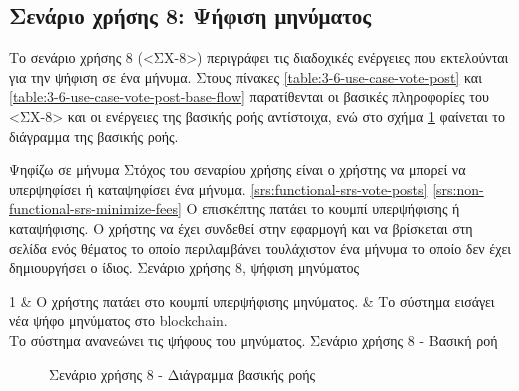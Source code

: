 \subsection{Σενάριο χρήσης 8: Ψήφιση μηνύματος} \label{subsection:3-6-use-case-vote-post}

Το σενάριο χρήσης 8 (<ΣΧ-8>) περιγράφει τις διαδοχικές ενέργειες που εκτελούνται για την ψήφιση σε ένα μήνυμα. Στους πίνακες \ref{table:3-6-use-case-vote-post} και \ref{table:3-6-use-case-vote-post-base-flow} παρατίθενται οι βασικές πληροφορίες του <ΣΧ-8> και οι ενέργειες της βασικής ροής αντίστοιχα, ενώ στο σχήμα \ref{figure:3-6-use-case-vote-post-base-flow-sequence-diagram} φαίνεται το διάγραμμα της βασικής ροής.

\useCaseTable
{Ψηφίζω σε μήνυμα}
{Στόχος του σεναρίου χρήσης είναι ο χρήστης να μπορεί να υπερψηφίσει ή καταψηφίσει ένα μήνυμα.}
{\ref{srs:functional-srs-vote-posts}}
{\ref{srs:non-functional-srs-minimize-fees}}
{Ο επισκέπτης πατάει το κουμπί υπερψήφισης ή καταψήφισης.}
{Ο χρήστης να έχει συνδεθεί στην εφαρμογή και να βρίσκεται στη σελίδα ενός θέματος το οποίο περιλαμβάνει τουλάχιστον ένα μήνυμα το οποίο δεν έχει δημιουργήσει ο ίδιος.}
{Σενάριο χρήσης 8, ψήφιση μηνύματος}
{\label{table:3-6-use-case-vote-post}}


\useCaseBaseFlowTable
{
    1 & Ο χρήστης πατάει στο κουμπί υπερψήφισης μηνύματος. & Το σύστημα εισάγει νέα ψήφο μηνύματος στο blockchain. \\ [0.5ex]
}
{Το σύστημα ανανεώνει τις ψήφους του μηνύματος.}
{Σενάριο χρήσης 8 - Βασική ροή}
{\label{table:3-6-use-case-vote-post-base-flow}}

\begin{figure}[H]
    \centering
    
    \caption{Σενάριο χρήσης 8 - Διάγραμμα βασικής ροής}
    \label{figure:3-6-use-case-vote-post-base-flow-sequence-diagram}
\end{figure}

